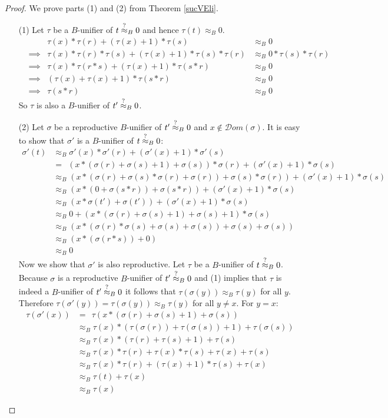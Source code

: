 		\begin{proof} We prove parts (1) and (2) from Theorem \ref{sucVEli}.
		\begin{itemize}
		\item[(1)] Let $\tau$ be a $B$-unifier of $t\stackrel{?}{\approx}_B0$ and hence $\tau(t)\approx_B0$.
		\begin{align*}
		&&\tau(x)*\tau(r)+(\tau(x)+1)*\tau(s)&\approx_B0\\
		&\implies&\tau(x)*\tau(r)*\tau(s)+(\tau(x)+1)*\tau(s)*\tau(r)&\approx_B0*\tau(s)*\tau(r)\\
		&\implies&\tau(x)*\tau(r*s)+(\tau(x)+1)*\tau(s*r)&\approx_B0\\
		&\implies&(\tau(x)+\tau(x)+1)*\tau(s*r)&\approx_B0\\
		&\implies&\tau(s*r)&\approx_B0
		\end{align*}
		So $\tau$ is also a $B$-unifier of $t'\stackrel{?}{\approx}_B0$.
		\item[(2)] Let $\sigma$ be a reproductive $B$-unifier of $t'\stackrel{?}{\approx}_B0$ and $x\notin\mathcal{D}om(\sigma)$. It is easy to show that $\sigma'$ is a $B$-unifier of $t\stackrel{?}{\approx}_B0$:
		\begin{align*}
		\sigma'(t)&\approx_B\sigma'(x)*\sigma'(r)+(\sigma'(x)+1)*\sigma'(s)\\
		&=\ \ (x*(\sigma(r)+\sigma(s)+1)+\sigma(s))*\sigma(r)+(\sigma'(x)+1)*\sigma(s)\\
		&\approx_B(x*(\sigma(r)+\sigma(s)*\sigma(r)+\sigma(r))+\sigma(s)*\sigma(r))+(\sigma'(x)+1)*\sigma(s)\\
		&\approx_B(x*(0+\sigma(s*r))+\sigma(s*r))+(\sigma'(x)+1)*\sigma(s)\\
		&\approx_B(x*\sigma(t')+\sigma(t'))+(\sigma'(x)+1)*\sigma(s)\\
		&\approx_B0+(x*(\sigma(r)+\sigma(s)+1)+\sigma(s)+1)*\sigma(s)\\
		&\approx_B(x*(\sigma(r)*\sigma(s)+\sigma(s)+\sigma(s))+\sigma(s)+\sigma(s))\\
		&\approx_B(x*(\sigma(r*s))+0)\\
		&\approx_B0
		\end{align*}
		Now we show that $\sigma'$ is also reproductive. Let $\tau$ be a $B$-unifier of $t\stackrel{?}{\approx}_B0$. Because $\sigma$ is a reproductive $B$-unifier of $t'\stackrel{?}{\approx}_B0$ and (1) implies that $\tau$ is indeed a $B$-unifier of $t'\stackrel{?}{\approx}_B0$ it follows that $\tau(\sigma(y))\approx_B\tau(y)$ for all $y$. Therefore $\tau(\sigma'(y))=\tau(\sigma(y))\approx_B\tau(y)$ for all $y\neq x$. For $y=x$:
		\begin{align*}
		\tau(\sigma'(x))&=\ \ \tau(x*(\sigma(r)+\sigma(s)+1)+\sigma(s))\\
		&\approx_B \tau(x)*(\tau(\sigma(r))+\tau(\sigma(s))+1)+\tau(\sigma(s))\\
		&\approx_B \tau(x)*(\tau(r)+\tau(s)+1)+\tau(s)\\
		&\approx_B \tau(x)*\tau(r)+\tau(x)*\tau(s)+\tau(x)+\tau(s)\\
		&\approx_B \tau(x)*\tau(r)+(\tau(x)+1)*\tau(s)+\tau(x)\\
		&\approx_B \tau(t)+\tau(x)\\
		&\approx_B \tau(x)
		\end{align*}
		\end{itemize}
		\end{proof}
